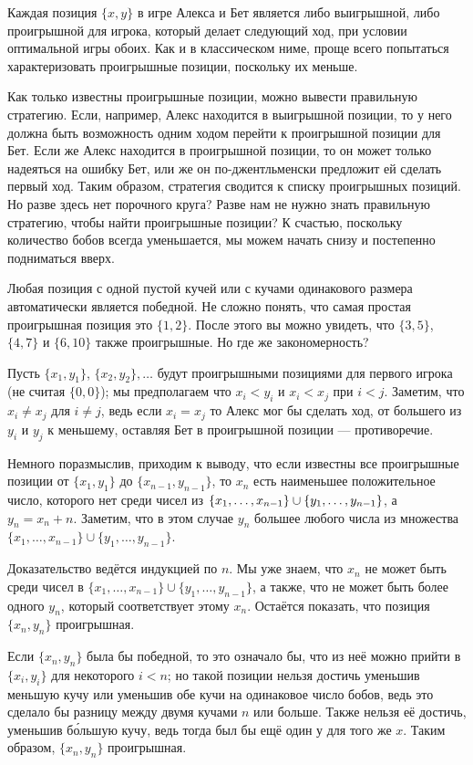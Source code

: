 Каждая позиция $\{x, y\}$ в игре Алекса и Бет является либо выигрышной, либо проигрышной для игрока, который делает следующий ход, при условии оптимальной игры обоих.
Как и в классическом ниме, проще всего попытаться характеризовать проигрышные позиции, поскольку их меньше.

Как только известны проигрышные позиции, можно вывести правильную стратегию.
Если, например, Алекс находится в выигрышной позиции, то у него должна быть возможность одним ходом перейти к проигрышной позиции для Бет.
Если же Алекс находится в проигрышной позиции, то он может только надеяться на ошибку Бет, или же он по-джентльменски предложит ей сделать первый ход.
Таким образом, стратегия сводится к списку проигрышных позиций.
Но разве здесь нет порочного круга?
Разве нам не нужно знать правильную стратегию, чтобы найти проигрышные позиции?
К счастью, поскольку количество бобов всегда уменьшается, мы можем начать снизу и постепенно подниматься вверх.

Любая позиция с одной пустой кучей или с кучами одинакового размера автоматически является победной.
Не сложно понять, что самая простая проигрышная позиция это $\{1, 2\}$.
После этого вы можно увидеть, что $\{3, 5\}$, $\{4, 7\}$ и $\{6, 10\}$ также проигрышные.
Но где же закономерность?

Пусть $\{x_1 , y_1\}$, $\{x_2 , y_2\},\dots$ будут проигрышными позициями для первого игрока (не считая $\{0, 0\}$);
мы предполагаем что $x_i < y_i$ и $x_i < x_j$ при $i < j$.
Заметим, что $x_i \ne x_j$ для $i \ne j$, ведь если $x_i = x_j$ то Алекс мог бы сделать ход, от большего из $y_i$ и $y_j$ к меньшему, оставляя Бет в проигрышной позиции --- противоречие.

Немного поразмыслив, приходим к выводу, что если известны все проигрышные позиции от $\{x_1 , y_1\}$ до $\{x_{n-1}, y_{n-1}\}$, то $x_n$ есть наименьшее положительное число, которого нет среди чисел из $\{x_1, \dots , x_{n-1}\} \z\cup \{y_1, \dots , y_{n-1}\}$, а $y_n = x_n + n$.
Заметим, что в этом случае $y_n$ большее  любого числа из множества $\{x_1, \dots , x_{n-1}\} \cup \{y_1, \dots , y_{n-1}\}$.

Доказательство ведётся индукцией по $n$.
Мы уже знаем, что $x_n$ не может быть среди чисел в $\{x_1, \dots , x_{n-1}\} \cup \{y_1, \dots , y_{n-1}\}$, а также, что не может быть более одного $y_n$, который соответствует этому $x_n$.
Остаётся показать, что позиция $\{x_n, y_n\}$ проигрышная.

Если $\{x_n, y_n\}$ была бы победной, то это означало бы, что из неё можно прийти в $\{x_i, y_i\}$ для некоторого $i < n$; но такой позиции нельзя достичь уменьшив меньшую кучу или уменьшив обе кучи на одинаковое число бобов, ведь это сделало бы разницу между двумя кучами $n$ или больше.
Также нельзя её достичь, уменьшив б\'{о}льшую кучу, ведь тогда был бы ещё один $у$ для того же $x$.
Таким образом, $\{x_n, y_n\}$ проигрышная.

